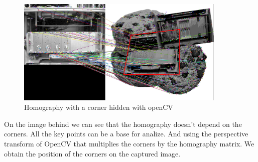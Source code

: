 	\begin{figure}
			\includegraphics[width=10cm]{images_not_compressed/showHomography.png}
			\caption{Homography with a corner hidden with openCV}
	\end{figure}
	\par On the image behind we can see that the homography doesn't depend on the corners. All the key points can be a base for analize. And using the perspective transform of OpenCV that multiplies the corners by the homography matrix. We obtain the position of the corners on the captured image.
